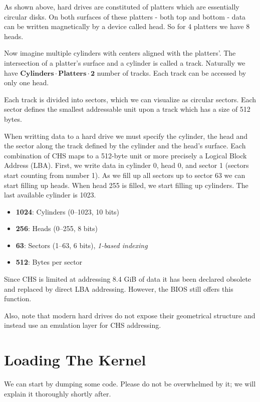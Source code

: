 As shown above, hard drives are constituted of platters which are essentially circular disks. On both surfaces
of these platters - both top and bottom - data can be written magnetically by a device called head. So for 
4 platters we have 8 heads. 

Now imagine multiple cylinders with centers aligned with the platters'. The intersection of a platter's surface 
and a cylinder is called a track. Naturally we have \(\textbf{Cylinders} \cdot \textbf{Platters} \cdot \textbf{2}\)
number of tracks. Each track can be accessed by only one head.

Each track is divided into sectors, which we can visualize as circular sectors. Each sector defines the smallest addressable
unit upon a track which has a size of 512 bytes.

When writting data to a hard drive we must specify the cylinder, the head and the sector along the track defined by the
cylinder and the head's surface. Each combination of CHS maps to a 512-byte unit or more precisely a Logical Block 
Address (LBA). First, we write data in cylinder 0, head 0, and sector 1 (sectors start counting from number 1). As we 
fill up all sectors up to sector 63 we can start filling up heads. When head 255 is filled, we start filling up cylinders. The 
last available cylinder is 1023. 

\begin{itemize}
    \item \textbf{1024}: Cylinders (0–1023, 10 bits)
    \item \textbf{256}: Heads (0–255, 8 bits)
    \item \textbf{63}: Sectors (1–63, 6 bits), \textit{1-based indexing}
    \item \textbf{512}: Bytes per sector
\end{itemize}

Since CHS is limited at addressing 8.4 GiB of data it has been declared obsolete and replaced by direct LBA addressing.
However, the BIOS still offers this function.

Also, note that modern hard drives do not expose their geometrical structure and instead use an emulation layer for
CHS addressing.

\section{Loading The Kernel}

We can start by dumping some code. Please do not be overwhelmed by it; we will explain it thoroughly shortly after.


